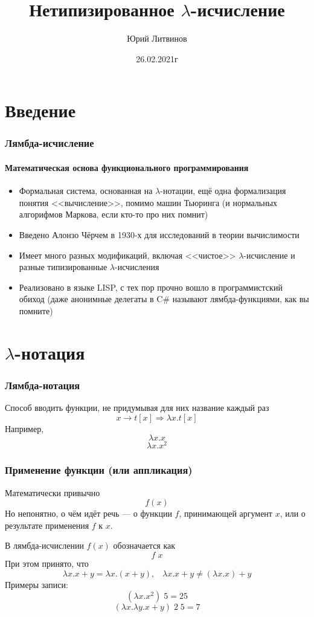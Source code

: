 \documentclass[xetex,mathserif,serif]{beamer}
\title{Нетипизированное $\lambda$-исчисление}
\author{Юрий Литвинов}
\date{26.02.2021г}
\begin{document}
    
    \frame{\titlepage}

    \section{Введение}
    
    \begin{frame}
        \frametitle{Лямбда-исчисление}
        \framesubtitle{Математическая основа функционального программирования}
        \begin{itemize}
            \item Формальная система, основанная на $\lambda$-нотации, ещё одна формализация
                    понятия <<вычисление>>, помимо машин Тьюринга (и нормальных алгорифмов
                    Маркова, если кто-то про них помнит)
            \item Введено Алонзо Чёрчем в 1930-х для исследований в теории вычислимости
            \item Имеет много разных модификаций, включая <<чистое>> $\lambda$-исчисление и
                    разные типизированные $\lambda$-исчисления
            \item Реализовано в языке LISP, с тех пор прочно вошло в программистский обиход
                    (даже анонимные делегаты в C\# называют лямбда-функциями, как вы помните)
        \end{itemize}
    \end{frame}
        
    \section{$\lambda$-нотация}
        
    \begin{frame}
        \frametitle{Лямбда-нотация}
        Способ вводить функции, не придумывая для них название каждый раз
        $$x \rightarrow t[x] \Longrightarrow \lambda x.t[x]$$
        Например,
        $$\lambda x.x$$
        $$\lambda x.x^2$$
    \end{frame}

    \begin{frame}
        \frametitle{Применение функции (или аппликация)}
        Математически привычно
        $$f(x)$$
        Но непонятно, о чём идёт речь --- о функции $f$, принимающей аргумент $x$, или о результате применения
        $f$ к $x$. 

        В лямбда-исчислении $f(x)$ обозначается как
        $$f \; x$$
        При этом принято, что
        $$\lambda x. x + y = \lambda x.(x + y), \;\;\; 
        \lambda x. x + y \neq (\lambda x.x) + y$$
        Примеры записи:
        $$(\lambda x.x^2) \; 5 = 25$$
        $$(\lambda x.\lambda y.x + y) \; 2 \; 5 = 7$$
    \end{frame}
\end{document}
